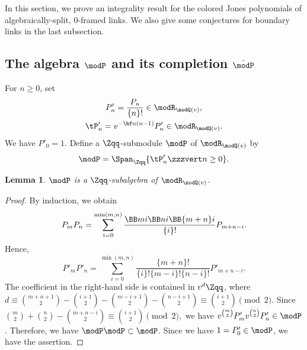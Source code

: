 \documentclass{amsart}
\numberwithin{equation}{section}
\numberwithin{figure}{section}
\theoremstyle{plain}
\newtheorem{lemma}[theorem]{Lemma}
\theoremstyle{definition}
\theoremstyle{remark}
\begin{document}
In this section, we prove an integrality result for the colored Jones
polynomials of algebraically-split, $0$-framed links.  We also give
some conjectures for boundary links in the last subsection.

\subsection{The algebra $\modP $ and its completion $\hat\modP $}
\label{sec:algebra--its-1}

For $n\ge 0$, set
\begin{gather*}
  P'_n = \frac{P_n}{\{n\}!}\in \modR _{\modQ (v)},\\
  \tP'_n = v^{-\hf n(n-1)}P'_n\in \modR _{\modQ (v)}.
\end{gather*}
We have $P'_0=1$.  Define a $\Zqq$-submodule $\modP $ of $\modR _{\modQ (v)}$ by
\begin{equation*}
  \modP  = \Span_{\Zqq}\{\tP'_n\zzzvert n\ge 0\}.
\end{equation*}

\begin{lemma}
  \label{r26}
  $\modP $ is a $\Zqq$-subalgebra of $\modR _{\modQ (v)}$.
\end{lemma}

\begin{proof}
  By induction, we obtain
  \begin{equation*}
    P_mP_n = \sum_{i=0}^{\min(m,n)}
    \frac{\BB mi\BB ni\BB{m+n}i}{\{i\}!}P_{m+n-i}.
  \end{equation*}
  Hence,
  \begin{equation}
    \label{eq:69}
    P'_mP'_n = \sum_{i=0}^{\min(m,n)}
    \frac{\{m+n\}!}{\{i\}!\{m-i\}!\{n-i\}!}P'_{m+n-i}.
  \end{equation}
  The coefficient in the right-hand side is contained in $v^d\Zqq$,
  where
  \begin{math}
    d\equiv\binom{m+n+1}2-\binom{i+1}2-\binom{m-i+1}2-\binom{n-i+1}2
    \equiv \binom{i+1}2\pmod2.
  \end{math}
  Since
  \begin{math}
    \binom m2+\binom n2 -\binom{m+n-i}2
      \equiv \binom{i+1}2\pmod2,
  \end{math}
  we have $v^{\binom m2}P'_mv^{\binom n2}P'_n\in \modP $.  Therefore, we have
  $\modP \modP \subset \modP $.  Since we have $1=P'_0\in \modP $, we have the assertion.
\end{proof}
\end{document}
